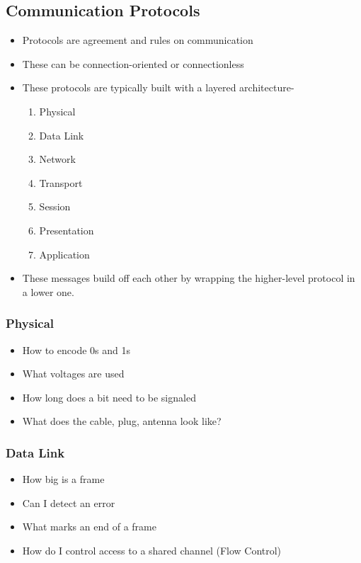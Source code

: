 \subsection{Communication Protocols}\label{subsec:Communication_Protocols}
\begin{itemize}[noitemsep]
\item Protocols are agreement and rules on communication
\item These can be connection-oriented or connectionless
\item These protocols are typically built with a layered architecture-
  \begin{enumerate}
  \item Physical
  \item Data Link
  \item Network
  \item Transport
  \item Session
  \item Presentation
  \item Application
  \end{enumerate}
\item These messages build off each other by wrapping the higher-level protocol in a lower one.
\end{itemize}

\subsubsection{Physical}\label{subsubsec:Physical_Protocols}
\begin{itemize}[noitemsep]
\item How to encode 0s and 1s
\item What voltages are used
\item How long does a bit need to be signaled
\item What does the cable, plug, antenna look like?
\end{itemize}

\subsubsection{Data Link}\label{subsubsec:Data_Link_Protocols}
\begin{itemize}[noitemsep]
\item How big is a frame
\item Can I detect an error
\item What marks an end of a frame
\item How do I control access to a shared channel (Flow Control)
\end{itemize}

